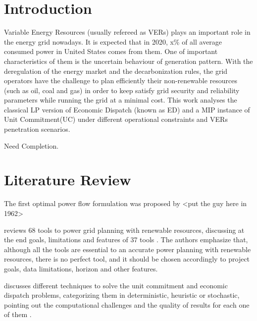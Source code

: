 \documentclass[12pt,LUDisStyle,twosided]{book}
\begin{document}
\pagestyle{plain}
\dissertationtrue



\tableofcontents
\nopagebreak
{}
\listoftables
{}
\listoffigures
\newpage
\pagestyle{plain}

\pagestyle{plain}

\chapter{Introduction}

Variable Energy Resources (usually refereed as VERs) plays an important role in the energy grid nowadays. It is expected that in 2020, x\% of all average consumed power in United States comes from them. One of important characteristics of them is the uncertain behaviour of generation pattern. With the deregulation of the energy market and the decarbonization rules, the grid operators have the challenge to plan efficiently their non-renewable resources (such as oil, coal and gas) in order to keep satisfy grid security and reliability parameters while running the grid at a minimal cost. This work analyses the classical LP version of Economic Dispatch (known as ED) and a MIP instance of Unit Commitment(UC) under different operational constraints and VERs penetration  scenarios.

Need Completion.

\chapter{Literature Review}


The first optimal power flow formulation was proposed by <put the guy here in 1962>

\citeauthor{connolly} reviews 68 tools to power grid planning with renewable resources, discussing at the end goals, limitations and features of 37 tools \cite{connolly}. The authors emphasize that, although all the tools are essential to an accurate power planning with renewable resources, there is no perfect tool, and it should be chosen accordingly to project goals, data limitations, horizon and other features. 

\citeauthor{yamin} discusses different techniques to solve the unit commitment and economic dispatch problems, categorizing them in deterministic, heuristic or stochastic, pointing out the computational challenges and the quality of results for each one of them \cite{yamin}. 
\end{document}
